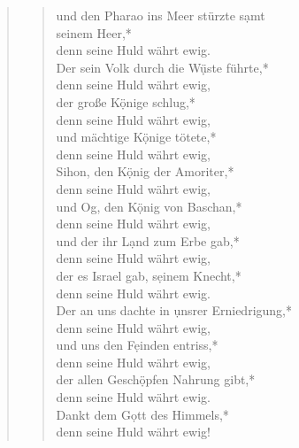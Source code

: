 \begin{quote}
\begin{verse}
und den Pharao ins Meer stürzte s\d amt\\ seinem Heer,*\\ 
denn seine Huld währt ewig.\\ \vin 
Der sein Volk durch die W\d üste führte,*\\ \vin 
denn seine Huld währt ewig,\\
der große K\d önige schlug,*\\ 
denn seine Huld währt ewig, \\ \vin
und mächtige K\d önige tötete,* \\ \vin
denn seine Huld währt ewig,\\ 
Sihon, den K\d önig der Amoriter,*\\ 
denn seine Huld währt ewig,\\
\vin und Og, den K\d önig von Baschan,*\\ \vin 
denn seine Huld währt ewig,\\ 
und der ihr L\d and zum Erbe gab,*\\ 
denn seine Huld währt ewig, \\
\vin der es Israel gab, s\d einem Knecht,*\\ \vin 
denn seine Huld währt ewig.\\   
Der an uns dachte in \d unsrer Erniedrigung,*\\ 
denn seine Huld währt ewig, \\ \vin
und uns den F\d einden entriss,*\\ \vin 
denn seine Huld währt ewig, \\ 
der allen Gesch\d öpfen Nahrung gibt,*\\ 
denn seine Huld währt ewig.\\ \vin 
Dankt dem G\d ott des Himmels,*\\ \vin 
denn seine Huld währt ewig!\\ 

 



\end{verse}

\end{quote}



